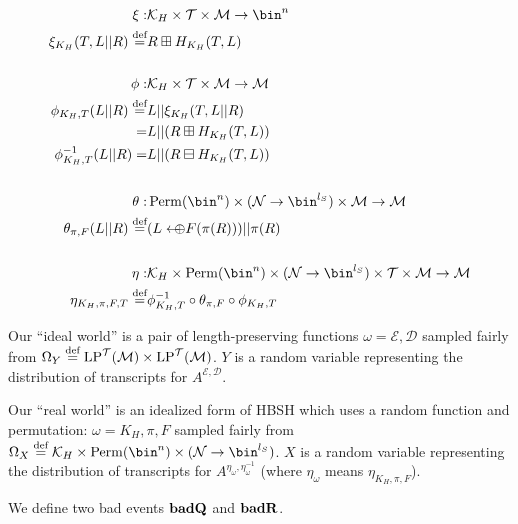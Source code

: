 \documentclass[eprint.tex]{subfiles}
\begin{document}
\begin{align*}
    \xi :& \mathcal{K}_H \times \mathcal{T} \times \mathcal{M} \rightarrow \bin^n \\
    \xi_{K_H}(T, L||R) \defeq& R \boxplus H_{K_H}(T, L) \\
    \vphantom{|} \\
    \phi :& \mathcal{K}_H \times \mathcal{T} \times \mathcal{M} \rightarrow \mathcal{M} \\
    \phi_{K_H, T}(L || R) \defeq& L || \xi_{K_H}(T, L||R) \\
    =& L || (R \boxplus H_{K_H}(T, L)) \\
    \phi^{-1}_{K_H, T}(L || R) =& L || (R \boxminus H_{K_H}(T, L)) \\
    \vphantom{|} \\
    \theta :& \Perm(\bin^n) \times (\mathcal{N} \rightarrow \bin^{l_S}) \times \mathcal{M} \rightarrow \mathcal{M} \\
    \theta_{\pi, F}(L || R) \defeq& (L \arrowoplus F(\pi(R))) || \pi(R) \\
    \vphantom{|} \\
    \eta :& \mathcal{K}_H \times \Perm(\bin^n) \times (\mathcal{N} \rightarrow \bin^{l_S}) \times \mathcal{T} \times \mathcal{M} \rightarrow \mathcal{M} \\
    \eta_{K_H, \pi, F, T} \defeq& \phi_{K_H,T}^{-1} \circ \theta_{\pi, F} \circ \phi_{K_H,T} \\
\end{align*}

Our ``ideal world''
is a pair of length-preserving functions
$\omega = \mathcal{E}, \mathcal{D}$
sampled fairly from
$\Omega_Y \stackrel{\text{def}}{=} \operatorname{LP}^\mathcal{T}(\mathcal{M}) \times \operatorname{LP}^\mathcal{T}(\mathcal{M})$.
$Y$ is a random variable representing the distribution of transcripts for
$A^{\mathcal{E}, \mathcal{D}}$.

Our ``real world'' is an idealized form of HBSH which uses a random function and permutation:
$\omega = K_H, \pi, F$
sampled fairly from
$\Omega_X \defeq \mathcal{K}_H \times \Perm(\bin^n) \times (\mathcal{N} \rightarrow \bin^{l_S})$.
$X$ is a random variable representing the distribution of transcripts for
$A^{\eta_{\omega}, \eta_{\omega}^{-1}}$ (where $\eta_{\omega}$ means $\eta_{K_H, \pi, F}$).

We define two bad events $\operatorname{\mathbf{badQ}}$ and $\operatorname{\mathbf{badR}}$.
\end{document}
